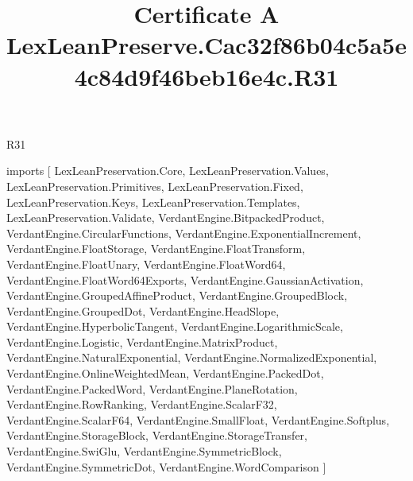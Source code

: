 \begin{lexlean}{R31}
\title{Certificate A LexLeanPreserve.Cac32f86b04c5a5e4c84d9f46beb16e4c.R31}
\begin{coremodule}
imports [
  LexLeanPreservation.Core,
  LexLeanPreservation.Values,
  LexLeanPreservation.Primitives,
  LexLeanPreservation.Fixed,
  LexLeanPreservation.Keys,
  LexLeanPreservation.Templates,
  LexLeanPreservation.Validate,
  VerdantEngine.BitpackedProduct,
  VerdantEngine.CircularFunctions,
  VerdantEngine.ExponentialIncrement,
  VerdantEngine.FloatStorage,
  VerdantEngine.FloatTransform,
  VerdantEngine.FloatUnary,
  VerdantEngine.FloatWord64,
  VerdantEngine.FloatWord64Exports,
  VerdantEngine.GaussianActivation,
  VerdantEngine.GroupedAffineProduct,
  VerdantEngine.GroupedBlock,
  VerdantEngine.GroupedDot,
  VerdantEngine.HeadSlope,
  VerdantEngine.HyperbolicTangent,
  VerdantEngine.LogarithmicScale,
  VerdantEngine.Logistic,
  VerdantEngine.MatrixProduct,
  VerdantEngine.NaturalExponential,
  VerdantEngine.NormalizedExponential,
  VerdantEngine.OnlineWeightedMean,
  VerdantEngine.PackedDot,
  VerdantEngine.PackedWord,
  VerdantEngine.PlaneRotation,
  VerdantEngine.RowRanking,
  VerdantEngine.ScalarF32,
  VerdantEngine.ScalarF64,
  VerdantEngine.SmallFloat,
  VerdantEngine.Softplus,
  VerdantEngine.StorageBlock,
  VerdantEngine.StorageTransfer,
  VerdantEngine.SwiGlu,
  VerdantEngine.SymmetricBlock,
  VerdantEngine.SymmetricDot,
  VerdantEngine.WordComparison
]


\end{coremodule}
\end{lexlean}
